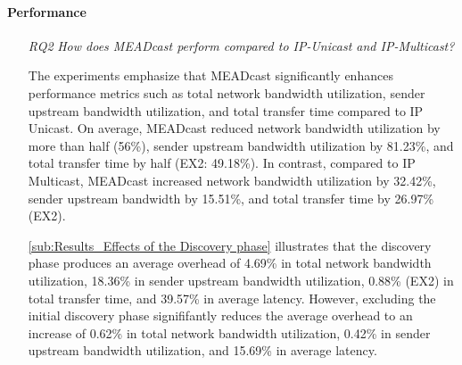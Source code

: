 \paragraph{Performance} %
\label{par:discussion_Performance}
\begin{itemize}
\item[\textit{RQ2}]
    \textit{How does MEADcast perform compared to IP-Unicast and IP-Multicast?}
    

    The experiments emphasize that MEADcast significantly enhances performance
        metrics such as total network bandwidth utilization, sender upstream
        bandwidth utilization, and total transfer time compared to IP Unicast.
    On average, MEADcast reduced network bandwidth utilization by more than
        half (56\%), sender upstream bandwidth utilization by 81.23\%, and
        total transfer time by half (EX2: 49.18\%).
    In contrast, compared to IP Multicast, MEADcast increased network bandwidth
        utilization by 32.42\%, sender upstream bandwidth by 15.51\%, and total
        transfer time by 26.97\% (EX2).

    \autoref{sub:Results_Effects of the Discovery phase} illustrates that the discovery
        phase produces an average overhead of 4.69\% in total network bandwidth
        utilization, 18.36\% in sender upstream bandwidth utilization, 0.88\%
        (EX2) in total transfer time, and 39.57\% in average latency.
    However, excluding the initial discovery phase signififantly reduces the 
        average overhead to an increase of 0.62\% in total network bandwidth
        utilization, 0.42\% in sender upstream bandwidth utilization, and
        15.69\% in average latency.


\end{itemize}

